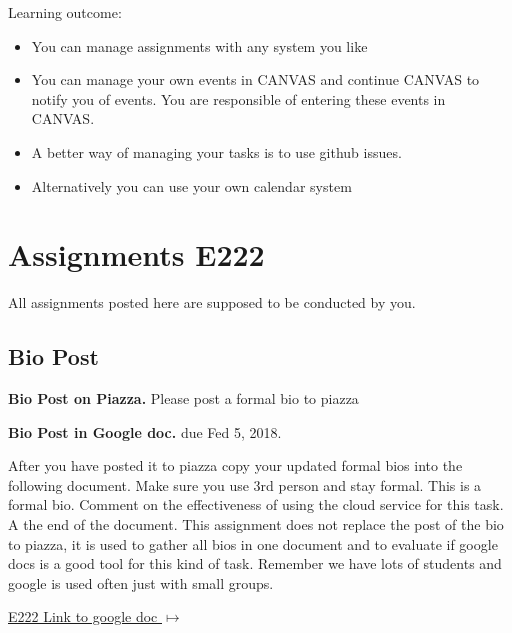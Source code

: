 Learning outcome:
\begin{itemize}
\item You can manage assignments with any system you like
\item You can manage your own events in CANVAS and continue CANVAS to
  notify you of events. You are responsible of entering these events
  in CANVAS.
\item A better way of managing your tasks is to use github issues.
\item Alternatively you can use your own calendar system
\end{itemize}


\section{Assignments E222}
\label{s:e222-assignment}
\label{s:e222-assignments}

All assignments posted here are supposed to be conducted by you. 

\subsection{Bio Post}
\label{E:e222-bio}

\begin{exercise}\label{E:e222-bio-piazza}
{\bf Bio Post on Piazza.} Please post a formal bio to piazza
\end{exercise}


\begin{exercise}\label{E:e222-bio-googledocs}

  {\bf Bio Post in Google doc.} due Fed 5, 2018. 
  
  After you have posted it to piazza
  copy your updated formal bios into the following document.  Make
  sure you use 3rd person and stay formal. This is a formal
  bio. Comment on the effectiveness of using the cloud service for
  this task. A the end of the document. This assignment does not
  replace the post of the bio to piazza, it is used to gather all bios
  in one document and to evaluate if google docs is a good tool for
  this kind of task. Remember we have lots of students and google is
  used often just with small groups.
 
 \smallskip

 {\hfill
   \href{https://docs.google.com/document/d/1pNK94qoRfZkill_JrGAzjd8aQ6Aar0pEXhU_Tgog0W0/edit?usp=sharing}{E222
     Link to google doc $\mapsto$}}

\end{exercise}

